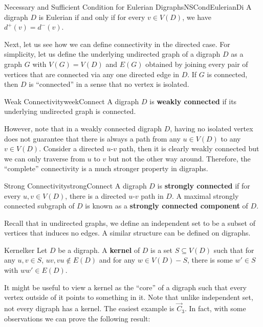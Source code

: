 \documentclass[math, code]{amznotes}
\theoremstyle{remark}
\begin{document}
\begin{probox}{Necessary and Sufficient Condition for Eulerian Digraphs}{NSCondEulerianDi}
    A digraph $D$ is Eulerian if and only if for every $v \in V(D)$, we have $d^+(v) = d^-(v)$.
\end{probox}
Next, let us see how we can define connectivity in the directed case. For simplicity, let us define the underlying undirected graph of a digraph $D$ as a graph $G$ with $V(G) = V(D)$ and $E(G)$ obtained by joining every pair of vertices that are connected via any one directed edge in $D$. If $G$ is connected, then $D$ is ``connected'' in a sense that no vertex is isolated.
\begin{dfnbox}{Weak Connectivity}{weekConnect}
    A digraph $D$ is {\color{red} \textbf{weakly connected}} if its underlying undirected graph is connected.
\end{dfnbox}
However, note that in a weakly connected digraph $D$, having no isolated vertex does not guarantee that there is always a path from any $u \in V(D)$ to any $v \in V(D)$. Consider a directed $u$-$v$ path, then it is clearly weakly connected but we can only traverse from $u$ to $v$ but not the other way around. Therefore, the ``complete'' connectivity is a much stronger property in digraphs.
\begin{dfnbox}{Strong Connectivity}{strongConnect}
    A digraph $D$ is {\color{red} \textbf{strongly connected}} if for every $u, v \in V(D)$, there is a directed $u$-$v$ path in $D$. A maximal strongly connected subgraph of $D$ is known as a {\color{red} \textbf{strongly connected component}} of $D$.
\end{dfnbox}
Recall that in undirected graphs, we define an independent set to be a subset of vertices that induces no edges. A similar structure can be defined on digraphs.
\begin{dfnbox}{Kernel}{ker}
    Let $D$ be a digraph. A {\color{red} \textbf{kernel}} of $D$ is a set $S \subseteq V(D)$ such that for any $u, v \in S$, $uv, vu \notin E(D)$ and for any $w \in V(D) - S$, there is some $w' \in S$ with $ww' \in E(D)$.
\end{dfnbox}
It might be useful to view a kernel as the ``core'' of a digraph such that every vertex outside of it points to something in it. Note that unlike independent set, not every digraph has a kernel. The easiest example is $\overrightarrow{C}_3$. In fact, with some observations we can prove the following result:
\end{document}
